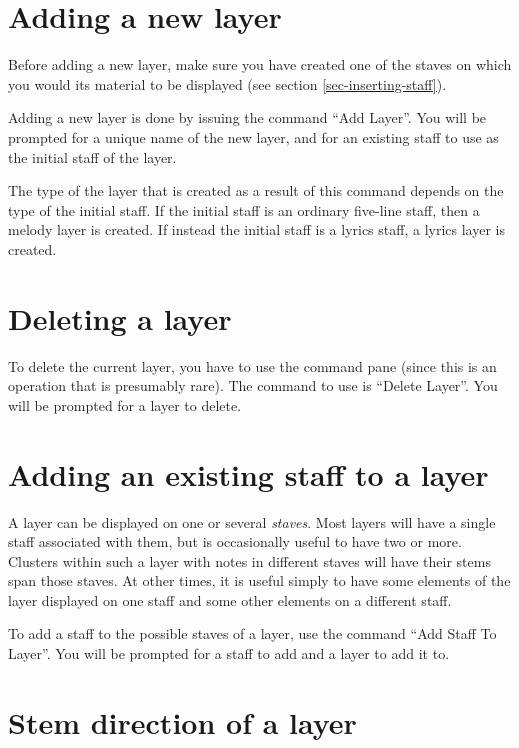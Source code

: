 \documentclass[11pt]{book}
\def\command#1{``#1''}
\begin{document}
\section{Adding a new layer}

Before adding a new layer, make sure you have created one of the
staves on which you would its material to be displayed (see section
\ref{sec-inserting-staff}).  

Adding a new layer is done by issuing the command \command{Add
  Layer}.  You will be prompted for a unique name of the new layer,
and for an existing staff to use as the initial staff of the layer. 

The type of the layer that is created as a result of this command
depends on the type of the initial staff.  If the initial staff is an
ordinary five-line staff, then a melody layer is created.  If instead
the initial staff is a lyrics staff, a lyrics layer is created. 

\section{Deleting a layer}

To delete the current layer, you have to use the command pane (since
this is an operation that is presumably rare).  The command to use is
\command{Delete Layer}. You will be prompted for a layer to delete. 

\section{Adding an existing staff to a layer}

A layer can be displayed on one or several \emph{staves}.  Most layers
will have a single staff associated with them, but is occasionally
useful to have two or more.  Clusters within such a layer with notes
in different staves will have their stems span those staves.  At other
times, it is useful simply to have some elements of the layer
displayed on one staff and some other elements on a different
staff.

To add a staff to the possible staves of a layer, use the command
\command{Add Staff To Layer}.  You will be prompted for a staff to add
and a layer to add it to.  

\section{Stem direction of a layer}
\end{document}
